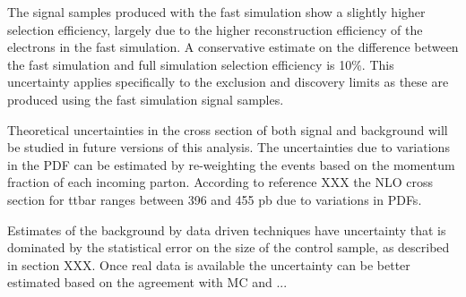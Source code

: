 \documentclass{cmspaper}
\begin{document}
The signal samples produced with the fast simulation show a slightly higher selection efficiency, largely due to the higher reconstruction efficiency of the 
electrons in the fast simulation.  A conservative estimate on the difference between the fast simulation and full simulation selection efficiency is 10\%.  This uncertainty 
applies specifically to the exclusion and discovery limits as these are produced using the fast simulation signal samples.

Theoretical uncertainties in the cross section of both signal and background will be studied in future versions of this analysis.  The uncertainties due to variations in the 
PDF can be estimated by re-weighting the events based on the momentum fraction of each incoming parton.  According to reference XXX 
the  NLO cross section for ttbar ranges between 396 and 455 pb due to variations in PDFs.  

Estimates of the background by data driven techniques have uncertainty that is dominated by the statistical error on the size of the control sample, 
as described in section XXX.  Once real data is available the uncertainty can be better estimated based on the agreement with MC and ...
\end{document}
